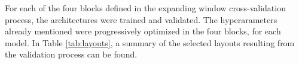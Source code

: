 



For each of the four blocks defined in the expanding window cross-validation process, the architectures were trained and validated. The hyperarameters already mentioned were progressively optimized in the four blocks, for each model. In Table \ref{tab:layouts}, a summary of the selected layouts resulting from the validation process can be found.

